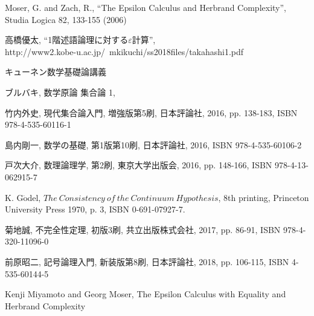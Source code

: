 \begin{thebibliography}{数字}
	 Moser, G. and Zach, R., ``The Epsilon Calculus and Herbrand Complexity'',
		Studia Logica 82, 133-155 (2006)
	
	 高橋優太, ``1階述語論理に対する$\varepsilon$計算'', \\
		http://www2.kobe-u.ac.jp/~mkikuchi/ss2018files/takahashi1.pdf 
		
	 キューネン数学基礎論講義
	
	 ブルバキ, 数学原論 集合論 1, 
	
	 竹内外史, 現代集合論入門, 増強版第5刷, 日本評論社, 2016, pp. 138-183, ISBN 978-4-535-60116-1
	
	 島内剛一, 数学の基礎, 第1版第10刷, 日本評論社, 2016, ISBN 978-4-535-60106-2
	
	 戸次大介, 数理論理学, 第2刷, 東京大学出版会, 2016, pp. 148-166, ISBN 978-4-13-062915-7
	
	 K. G$\ddot{\mbox{o}}$del, $The\ Consistency\ of\ the\ Continuum\ Hypothesis$, 8th printing, Princeton University Press 1970, p. 3, ISBN 0-691-07927-7.
	
	 菊地誠, 不完全性定理, 初版3刷, 共立出版株式会社, 2017, pp. 86-91, ISBN 978-4-320-11096-0
	
	 前原昭二, 記号論理入門, 新装版第8刷, 日本評論社, 2018, pp. 106-115, ISBN 4-535-60144-5
	
	 Kenji Miyamoto and Georg Moser, The Epsilon Calculus with Equality and Herbrand Complexity
\end{thebibliography}